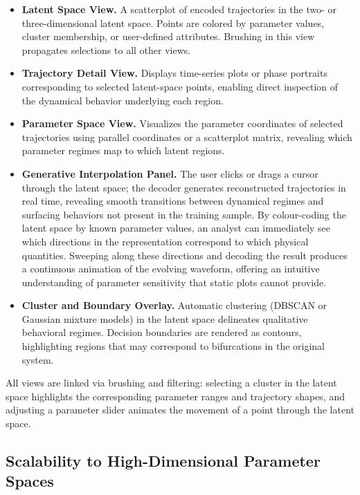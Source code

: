 \documentclass{article}
\begin{document}
\begin{itemize}
    \item \textbf{Latent Space View.} A scatterplot of encoded trajectories in
    the two- or three-dimensional latent space. Points are colored by parameter
    values, cluster membership, or user-defined attributes. Brushing in this
    view propagates selections to all other views.

    \item \textbf{Trajectory Detail View.} Displays time-series plots or phase
    portraits corresponding to selected latent-space points, enabling direct
    inspection of the dynamical behavior underlying each region.

    \item \textbf{Parameter Space View.} Visualizes the parameter coordinates
    of selected trajectories using parallel coordinates or a scatterplot
    matrix, revealing which parameter regimes map to which latent regions.

    \item \textbf{Generative Interpolation Panel.} The user clicks or drags a
    cursor through the latent space; the decoder generates reconstructed
    trajectories in real time, revealing smooth transitions between dynamical
    regimes and surfacing behaviors not present in the training sample.
    By colour-coding the latent space by known parameter values, an analyst can
    immediately see which directions in the representation correspond to which
    physical quantities. Sweeping along these directions and decoding the
    result produces a continuous animation of the evolving waveform, offering
    an intuitive understanding of parameter sensitivity that static plots
    cannot provide.

    \item \textbf{Cluster and Boundary Overlay.} Automatic clustering
    (DBSCAN or Gaussian mixture models) in the latent space delineates
    qualitative behavioral regimes. Decision boundaries are rendered as
    contours, highlighting regions that may correspond to bifurcations in the
    original system.
\end{itemize}

All views are linked via brushing and filtering: selecting a cluster in the
latent space highlights the corresponding parameter ranges and trajectory
shapes, and adjusting a parameter slider animates the movement of a point
through the latent space.

\subsection{Scalability to High-Dimensional Parameter Spaces}
\end{document}
